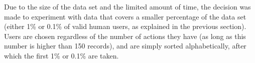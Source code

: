 \begin{table}[htbp]
	\centering
	\caption{The data set structure}\label{tab:data}
\end{table}

Due to the size of the data set and the limited amount of time, the decision was made to experiment with data that covers a smaller percentage of the data set (either 1\% or 0.1\% of valid human users, as explained in the previous section). Users are chosen regardless of the number of actions they have (as long as this number is higher than 150 records), and are simply sorted alphabetically, after which the first 1\% or 0.1\% are taken.

